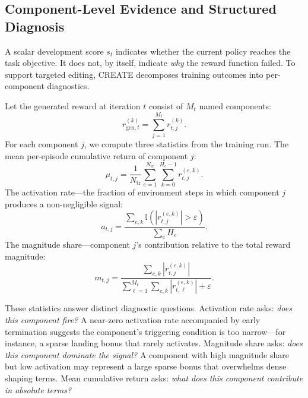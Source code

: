 \documentclass[letterpaper,twocolumn,10pt]{article}
\begin{document}
\subsection{Component-Level Evidence and Structured Diagnosis}

A scalar development score $s_t$ indicates whether the current policy reaches the task objective. It does not, by itself, indicate \emph{why} the reward function failed. To support targeted editing, CREATE decomposes training outcomes into per-component diagnostics.

Let the generated reward at iteration $t$ consist of $M_t$ named components:
\begin{equation}
r_{\text{gen},t}^{(k)} = \sum_{j=1}^{M_t} r_{t,j}^{(k)}.
\label{eq:components}
\end{equation}
For each component $j$, we compute three statistics from the training run. The mean per-episode cumulative return of component $j$:
\begin{equation}
\mu_{t,j} = \frac{1}{N_{\text{tr}}}\sum_{e=1}^{N_{\text{tr}}}\sum_{k=0}^{H_e-1} r_{t,j}^{(e,k)}.
\label{eq:mu}
\end{equation}
The activation rate---the fraction of environment steps in which component $j$ produces a non-negligible signal:
\begin{equation}
a_{t,j} = \frac{\sum_{e,k} \mathbb{I}(|r_{t,j}^{(e,k)}| > \varepsilon)}{\sum_e H_e}.
\label{eq:activation}
\end{equation}
The magnitude share---component $j$'s contribution relative to the total reward magnitude:
\begin{equation}
m_{t,j} = \frac{\sum_{e,k}|r_{t,j}^{(e,k)}|}{\sum_{\ell=1}^{M_t}\sum_{e,k}|r_{t,\ell}^{(e,k)}| + \varepsilon}.
\label{eq:magnitude}
\end{equation}

These statistics answer distinct diagnostic questions. Activation rate asks: \emph{does this component fire?} A near-zero activation rate accompanied by early termination suggests the component's triggering condition is too narrow---for instance, a sparse landing bonus that rarely activates. Magnitude share asks: \emph{does this component dominate the signal?} A component with high magnitude share but low activation may represent a large sparse bonus that overwhelms dense shaping terms. Mean cumulative return asks: \emph{what does this component contribute in absolute terms?}
\end{document}
